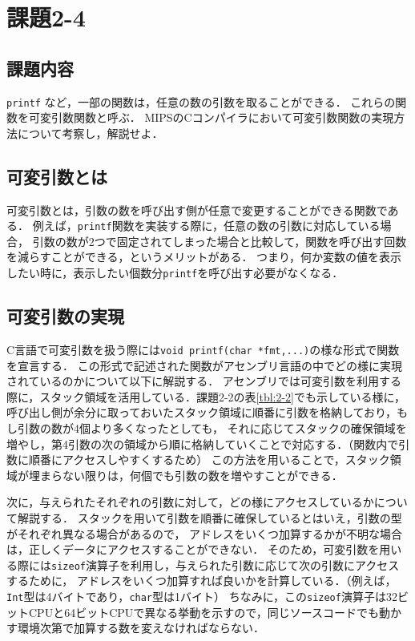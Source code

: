 \documentclass[a4j,11pt]{jarticle}
\begin{document}
\section{課題2-4}
\subsection{課題内容}

{\tt printf} など，一部の関数は，任意の数の引数を取ることができる．
これらの関数を可変引数関数と呼ぶ．
MIPSのCコンパイラにおいて可変引数関数の実現方法について考察し，解説せよ．

\subsection{可変引数とは}

可変引数とは，引数の数を呼び出す側が任意で変更することができる関数である．
例えば，{\tt printf}関数を実装する際に，任意の数の引数に対応している場合，
引数の数が2つで固定されてしまった場合と比較して，関数を呼び出す回数を減らすことができる，というメリットがある．
つまり，何か変数の値を表示したい時に，表示したい個数分{\tt printf}を呼び出す必要がなくなる．

\subsection{可変引数の実現}

C言語で可変引数を扱う際には{\tt void printf(char *fmt,...)}の様な形式で関数を宣言する．
この形式で記述された関数がアセンブリ言語の中でどの様に実現されているのかについて以下に解説する．
アセンブリでは可変引数を利用する際に，スタック領域を活用している．課題2-2の表\ref{tbl:2-2}でも示している様に，
呼び出し側が余分に取っておいたスタック領域に順番に引数を格納しており，もし引数の数が4個より多くなったとしても，
それに応じてスタックの確保領域を増やし，第4引数の次の領域から順に格納していくことで対応する．（関数内で引数に順番にアクセスしやすくするため）
この方法を用いることで，スタック領域が埋まらない限りは，何個でも引数の数を増やすことができる．

次に，与えられたそれぞれの引数に対して，どの様にアクセスしているかについて解説する．
スタックを用いて引数を順番に確保しているとはいえ，引数の型がそれぞれ異なる場合があるので，
アドレスをいくつ加算するかが不明な場合は，正しくデータにアクセスすることができない．
そのため，可変引数を用いる際には{\tt sizeof}演算子を利用し，与えられた引数に応じて次の引数にアクセスするために，
アドレスをいくつ加算すれば良いかを計算している．（例えば，{\tt Int}型は4バイトであり，{\tt char}型は1バイト）
ちなみに，この{\tt sizeof}演算子は32ビットCPUと64ビットCPUで異なる挙動を示すので，同じソースコードでも動かす環境次第で加算する数を変えなければならない．
\end{document}
